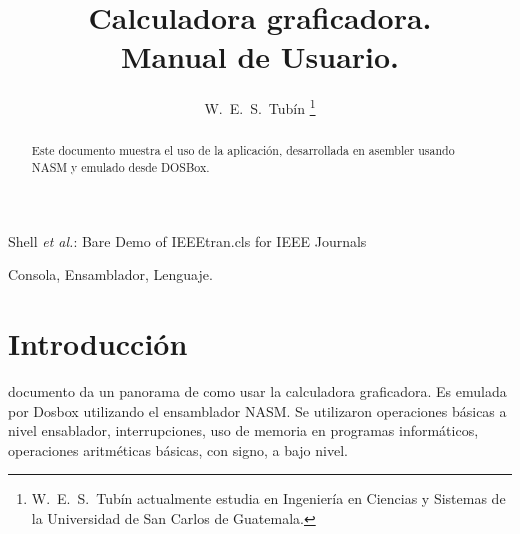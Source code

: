 \documentclass[journal]{../../IEEEtran/IEEEtran}
\begin{document}
\title{Calculadora graficadora.\\Manual de Usuario.}


\author { W.~E.~S.~Tubín \thanks{W.~E.~S.~Tubín actualmente
    estudia en Ingeniería en Ciencias y Sistemas de la Universidad de
    San Carlos de Guatemala. } }


%
{Shell \MakeLowercase{\textit{et al.}}: Bare Demo of IEEEtran.cls for IEEE Journals}

\maketitle

\begin{abstract}
  Este documento muestra el uso de la aplicación, desarrollada en
  asembler usando NASM y emulado desde DOSBox.
\end{abstract}


\begin{IEEEkeywords}
Consola, Ensamblador, Lenguaje.
\end{IEEEkeywords}



%



\section{Introducción}
% 
% 
% 
% 
 documento da un panorama de como usar la
calculadora graficadora. Es emulada por Dosbox utilizando el
ensamblador NASM. Se utilizaron operaciones básicas a nivel
ensablador, interrupciones, uso de memoria en programas informáticos,
operaciones aritméticas básicas, con signo, a bajo nivel.
\end{document}

